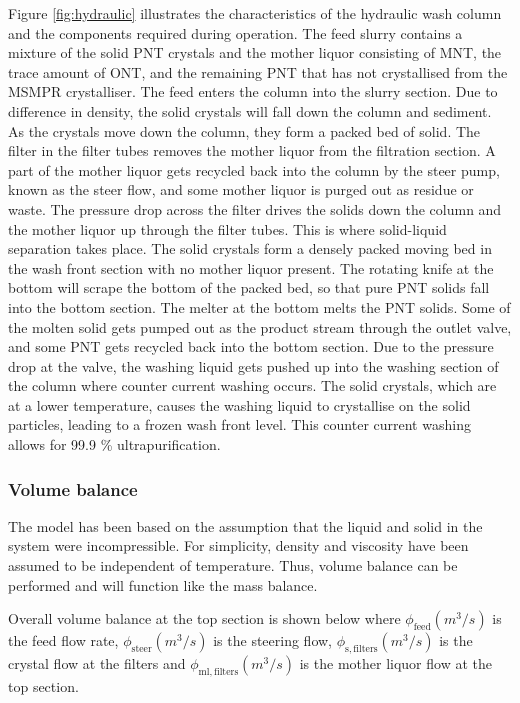 Figure \ref{fig:hydraulic} illustrates the characteristics of the hydraulic wash column and the components required during operation. The feed slurry contains a mixture of the solid PNT crystals and the mother liquor consisting of MNT, the trace amount of ONT, and the remaining PNT that has not crystallised from the MSMPR crystalliser. The feed enters the column into the slurry section. Due to difference in density, the solid crystals will fall down the column and sediment. As the crystals move down the column, they form a packed bed of solid. The filter in the filter tubes removes the mother liquor from the filtration section. A part of the mother liquor gets recycled back into the column by the steer pump, known as the steer flow, and some mother liquor is purged out as residue or waste. The pressure drop across the filter drives the solids down the column and the mother liquor up through the filter tubes. This is where solid-liquid separation takes place. The solid crystals form a densely packed moving bed in the wash front section with no mother liquor present. The rotating knife at the bottom will scrape the bottom of the packed bed, so that pure PNT solids fall into the bottom section. The melter at the bottom melts the PNT solids. Some of the molten solid gets pumped out as the product stream through the outlet valve, and some PNT gets recycled back into the bottom section. Due to the pressure drop at the valve, the washing liquid gets pushed up into the washing section of the column where counter current washing occurs. The solid crystals, which are at a lower temperature, causes the washing liquid to crystallise on the solid particles, leading to a frozen wash front level. This counter current washing allows for 99.9 \% ultrapurification. 

\subsubsection{Volume balance} 
The model has been based on the assumption that the liquid and solid in the system were incompressible. For simplicity, density and viscosity have been assumed to be independent of temperature. Thus, volume balance can be performed and will function like the mass balance. 

Overall volume balance at the top section is shown below where $\phi_{\mathrm{feed}} (m^{3}/s)$ is the feed flow rate, $\phi_{\mathrm{steer}} (m^{3}/s)$ is the steering flow, $\phi_{\mathrm{s,filters}} (m^{3}/s)$ is the crystal flow at the filters and $\phi_{\mathrm{ml,filters}} (m^{3}/s)$ is the mother liquor flow at the top section.

